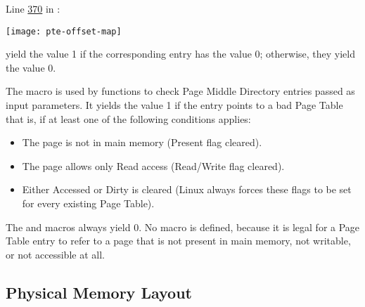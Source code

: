 \begin{description}
  Line \href{http://lxr.linux.no/linux+v2.6.11/include/asm-i386/pgtable.h#L370}{370} in
  :
  \begin{center}
    \texttt{[image: pte-offset-map]}
  \end{center}

\item[\code{pte\_none, pmd\_none, pud\_none, pgd\_none}] yield the value 1 if the
  corresponding entry has the value 0; otherwise, they yield the value 0.
\item[\code{pmd\_bad, pud\_bad, pgd\_bad}] The  macro is used by functions to
  check Page Middle Directory entries passed as input parameters. It yields the value 1 if
  the entry points to a bad Page Table that is, if at least one of the following
  conditions applies:
  \begin{itemize}
  \item The page is not in main memory (Present flag cleared).
  \item The page allows only Read access (Read/Write flag cleared).
  \item Either Accessed or Dirty is cleared (Linux always forces these flags to be set for
    every existing Page Table).
  \end{itemize}
  The  and  macros always yield 0. No  macro is
  defined, because it is legal for a Page Table entry to refer to a page that is not
  present in main memory, not writable, or not accessible at all.
\end{description}

\subsection{Physical Memory Layout}
\label{sec:phys-memory-layo}

